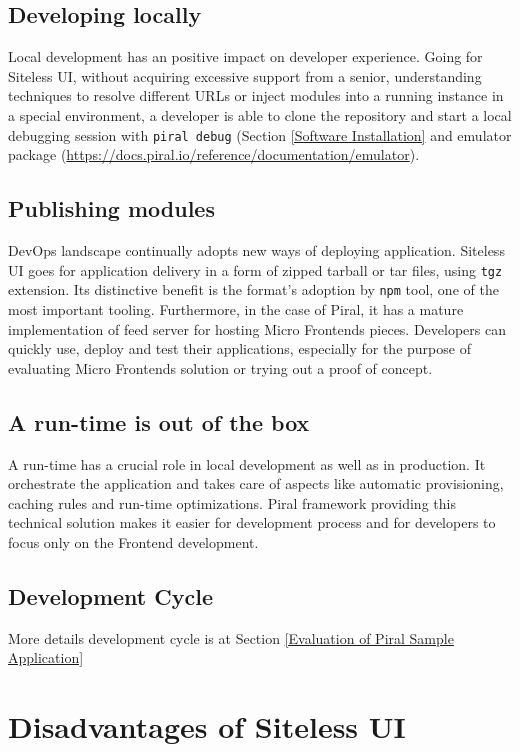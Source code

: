 \documentclass[a4paper]{book}
\begin{document}
\subsection{Developing locally}
Local development has an positive impact on developer experience. Going for Siteless UI, without acquiring excessive support from a senior, understanding techniques to resolve different URLs or inject modules into a running instance in a special environment, a developer is able to clone the repository and start a local debugging session with \verb|piral debug| (Section \ref{Software Installation} and emulator package (\url{https://docs.piral.io/reference/documentation/emulator}).

\subsection{Publishing modules}
DevOps landscape continually adopts new ways of deploying application. Siteless UI goes for application delivery in a form of zipped tarball or tar files, using \verb|tgz| extension. Its distinctive benefit is the format's adoption by \verb|npm| tool, one of the most important tooling. Furthermore, in the case of Piral, it has a mature implementation of feed server for hosting Micro Frontends pieces. Developers can quickly use, deploy and test their applications, especially for the purpose of evaluating Micro Frontends solution or trying out a proof of concept. \cite{Rap20}

\subsection{A run-time is out of the box}
A run-time has a crucial role in local development as well as in production. It orchestrate the application and takes care of aspects like automatic provisioning, caching rules and run-time optimizations. Piral framework providing this technical solution makes it easier for development process and for developers to focus only on the Frontend development.

\subsection{Development Cycle}
More details development cycle is at Section \ref{Evaluation of Piral Sample Application}

\section{Disadvantages of Siteless UI}
\end{document}
